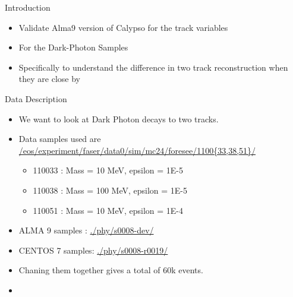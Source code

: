 \begin{frame}{Introduction}
    \begin{itemize}
        \item Validate Alma9 version of Calypso for the track variables
        \item For the Dark-Photon Samples
        \item Specifically to understand the difference in two track reconstruction when they are close by
    \end{itemize}
\end{frame}

\begin{frame}{Data Description}
    \begin{itemize}
        \item We want to look at Dark Photon decays to two tracks.
        \item Data samples used are \href{/eos/experiment/faser/data0/sim/mc24/foresee/1100*/phy/}{/eos/experiment/faser/data0/sim/mc24/foresee/1100\{33,38,51\}/}
        \vspace{-0.25cm}\begin{itemize}
            \item 110033 : Mass = 10  MeV, epsilon = 1E-5 
            \item 110038 : Mass = 100 MeV, epsilon = 1E-5 
            \item 110051 : Mass = 10  MeV, epsilon = 1E-4 
        \end{itemize}
        \item ALMA 9 samples : \href{./phy/s0008-dev/}{./phy/s0008-dev/} 
        \item CENTOS 7 samples: \href{./phy/s0008-r0019/}{./phy/s0008-r0019/}
        \item Chaning them together gives a total of 60k events.
        \item {\color{red}{Justification for chaining given diff mass/couplings?}}
    \end{itemize}
    
\end{frame}

